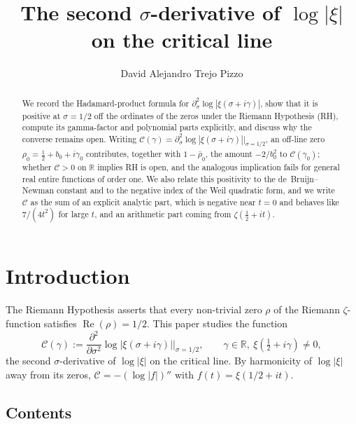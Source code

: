 \documentclass[11pt]{amsart}
\title[The second $\sigma$-derivative of $\log|\xi|$]{The second $\sigma$-derivative of $\log|\xi|$\\
  on the critical line}
\author{David Alejandro Trejo Pizzo}
\renewcommand{\Re}{\operatorname{Re}}
\begin{document}
\begin{abstract}
We record the Hadamard-product formula for $\partial^2_\sigma\log|\xi(\sigma+i\gamma)|$,
show that it is positive at $\sigma=1/2$ off the ordinates of the zeros under the
Riemann Hypothesis (RH), compute its gamma-factor and polynomial parts explicitly, and
discuss why the converse remains open. Writing
$\mathcal C(\gamma)=\partial^2_\sigma\log|\xi(\sigma+i\gamma)|\big|_{\sigma=1/2}$, an off-line
zero $\rho_0=\tfrac12+b_0+i\gamma_0$ contributes, together with $1-\bar\rho_0$, the amount
$-2/b_0^2$ to $\mathcal C(\gamma_0)$; whether $\mathcal C>0$ on $\mathbb R$ implies RH is
open, and the analogous implication fails for general real entire functions of order one.
We also relate this positivity to the de~Bruijn--Newman constant and to the negative index
of the Weil quadratic form, and we write $\mathcal C$ as the sum of an explicit analytic
part, which is negative near $t=0$ and behaves like $7/(4t^2)$ for large $t$, and an
arithmetic part coming from $\zeta(\tfrac12+it)$.
\end{abstract}

\maketitle

\tableofcontents
\newpage

\section{Introduction}
\label{sec:intro}

The Riemann Hypothesis asserts that every non-trivial zero $\rho$ of the Riemann
$\zeta$-function satisfies $\Re(\rho) = 1/2$. This paper studies the function
\[
  \mathcal{C}(\gamma) := \frac{\partial^2}{\partial\sigma^2}\log|\xi(\sigma+i\gamma)|\bigg|_{\sigma=1/2},
  \qquad \gamma\in\mathbb R,\ \xi(\tfrac12+i\gamma)\neq0,
\]
the second $\sigma$-derivative of $\log|\xi|$ on the critical line. By harmonicity of
$\log|\xi|$ away from its zeros, $\mathcal C=-(\log|f|)''$ with $f(t)=\xi(1/2+it)$.

\subsection*{Contents}
\end{document}
